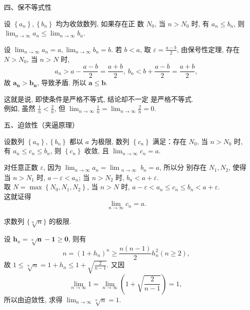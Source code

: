 \documentclass [t,12pt,mathserif] {beamer}
\begin{document}
\begin{frame}{ 四、保不等式性}%
\begin{thm}
设 $\left\{a_n\right\},\left\{b_n\right\}$ 均为收敛数列, 如果存在正 数 $N_0$, 当 $n>N_0$ 时, 有 $a_n \leq b_n$, 则 $\lim _{n \rightarrow \infty} a_n \leq \lim _{n \rightarrow \infty} b_n$.
\end{thm}
\zheng 设 $\lim _{n \rightarrow \infty} a_n=a, \lim _{n \rightarrow \infty} b_n=b$. 若 $b<a$, 取 $\varepsilon=\frac{a-b}{2}$, 由保号性定理, 存在 $N>N_0$, 当 $n>N$ 时,
$$
a_n>a-\frac{a-b}{2}=\frac{a+b}{2},~ b_n<b+\frac{a-b}{2}=\frac{a+b}{2},
$$
故 $\boldsymbol{a}_{\boldsymbol{n}}>\boldsymbol{b}_{\boldsymbol{n}}$, 导致矛盾. 所以 $\boldsymbol{a} \leq \boldsymbol{b}$.   
\end{frame}



\begin{frame}{}%
\alert{这就是说, 即使条件是严格不等式, 结论却不一定 是严格不等式.}\\
\baselineskip
例如, 虽然 $\frac{1}{n}<\frac{2}{n}$, 但 $\lim _{n \rightarrow \infty} \frac{1}{n}=\lim _{n \rightarrow \infty} \frac{2}{n}=0$.
    
\end{frame}


\begin{frame}{ 五、迫敛性（夹逼原理）}%
\begin{thm}
设数列 $\left\{a_n\right\},\left\{b_n\right\}$ 都以 $a$ 为极限, 数列 $\left\{c_n\right\}$
满足：存在 $N_0$, 当 $n>N_0$ 时, 有 $a_n \leq c_n \leq b_n$, 则 $\left\{c_n\right\}$ 收敛, 且 $\lim _{n \rightarrow \infty} c_n=a$.
\end{thm}
\zheng  对任意正数 $\varepsilon$, 因为 $\lim _{n \rightarrow \infty} a_n=\lim _{\substack{n \rightarrow \infty}} b_n=a$, 所以分 别存在 $N_1, N_2$, 使得\\
当 $n>N_1$ 时, $a-\varepsilon<a_n$;
当 $n>N_2$ 时, $b_n<a+\varepsilon$. \\
取 $N=\max \left\{N_0, N_1, N_2\right\}$,
当 $n>N$ 时, $a-\varepsilon<a_n \leq c_n \leq b_n<a+\varepsilon$.\\
这就证得  
$$
\lim _{n \rightarrow \infty} c_n=a. 
$$

\end{frame}


\begin{frame}{}%
\begin{ex}
求数列 $\{\sqrt[n]{n}\}$ 的极限.   
\end{ex}
\jie  设 $\boldsymbol{h}_n=\sqrt[n]{\boldsymbol{n}}-\mathbf{1} \geq \mathbf{0}$, 则有
$$
n=\left(1+h_n\right)^n \geq \frac{n(n-1)}{2} h_n^2(n \geq 2),
$$
故 $1 \leq \sqrt[n]{n}=1+h_n \leq 1+\sqrt{\frac{2}{n-1}}$. 又因
$$
\lim _{n \rightarrow \infty} 1=\lim _{n \rightarrow \infty}\left(1+\sqrt{\frac{2}{n-1}}\right)=1 \text {, }
$$
所以由迫敛性, 求得 $\lim _{n \rightarrow \infty} \sqrt[n]{n}=1$. 
\end{frame}
\end{document}
